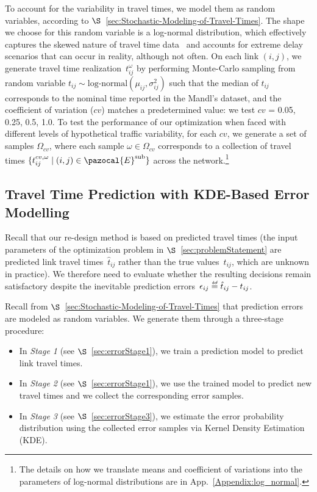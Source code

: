 \documentclass[a4paper,fleqn]{cas-sc}
\newcommand{\defeq}{\stackrel{\scalebox{0.5}{\ensuremath{\mathsf{\,def}}}}{=}}
\begin{document}
To account for the variability in travel times, we model them as random variables, according to $\S$~\ref{sec:Stochastic-Modeling-of-Travel-Times}. The shape we choose for this random variable is a log-normal distribution, which effectively captures the skewed nature of travel time data~\citep{guessous2014estimating} and accounts for extreme delay scenarios that can occur in reality, although not often.
%
On each link $(i,j)$, we generate travel time realization~$t_{ij}^\omega$ by performing Monte-Carlo sampling from random variable $t_{ij} \sim \text{log-normal}(\mu_{ij}, \sigma_{ij}^2)$ such that the median of $t_{ij}$ corresponds to the nominal time reported in the Mandl's dataset, and the coefficient of variation ($cv$) matches a predetermined value: we test $cv$ = 0.05, 0.25, 0.5, 1.0.
To test the performance of our optimization when faced with different levels of hypothetical traffic variability, for each $cv$, we generate a set of samples $\Omega_{cv}$, where each sample $\omega \in \Omega_{cv}$ corresponds to a collection of travel times $\{t_{ij}^{cv,\omega} \mid (i,j) \in \pazocal{E}^{\text{sub}}\}$ across the network.\footnote{The details on how we translate means and coefficient of variations into the parameters of log-normal distributions are in App.~\ref{Appendix:log_normal}.}
\subsection{Travel Time Prediction with KDE-Based Error Modelling}
\label{sec:KDE}

Recall that our re-design method is based on predicted travel times (the input parameters of the optimization problem in $\S$~\ref{sec:problemStatement} are predicted link travel times~$\hat t_{ij}$ rather than the true values~$t_{ij}$, which are unknown in practice). We therefore need to evaluate whether the resulting decisions remain satisfactory despite the inevitable prediction errors~$\epsilon_{ij} \defeq \hat t_{ij}-t_{ij}$.

Recall from $\S$~\ref{sec:Stochastic-Modeling-of-Travel-Times} that prediction errors are modeled as random variables. 
We generate them through a three-stage procedure:
\begin{itemize}
\item In \emph{Stage 1} (see $\S$~\ref{sec:errorStage1}), we train a prediction model to predict link travel times. 
\item In \emph{Stage 2} (see $\S$~\ref{sec:errorStage1}), we use the trained model to predict new travel times and we collect the corresponding error samples.
\item In \emph{Stage 3} (see $\S$~\ref{sec:errorStage3}), we estimate the error probability distribution using the collected error samples via Kernel Density Estimation (KDE).
\end{itemize}
%
%
 
\end{document}
